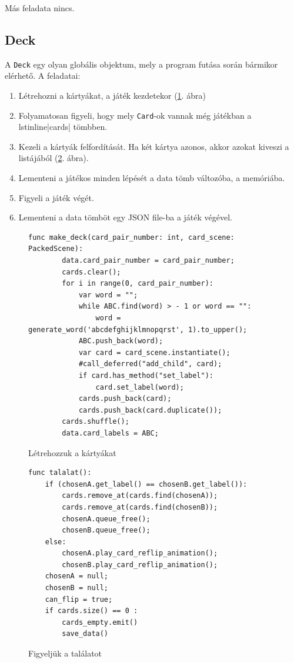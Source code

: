 Más feladata nincs. 


\subsection{Deck}
A \lstinline|Deck| egy olyan globális objektum, mely a program futása során bármikor elérhető. A feladatai: 
\begin{enumerate}
\item Létrehozni a kártyákat, a játék kezdetekor (\ref{code:make_deck}. ábra)
\item Folyamatosan figyeli, hogy mely \lstinline|Card|-ok vannak még játékban a lstinline|cards| tömbben.
\item Kezeli a kártyák felfordítását. Ha két kártya azonos, akkor azokat kiveszi a listájából (\ref{code:talalat}. ábra).
\item Lementeni a játékos minden lépését a data tömb változóba, a memóriába. 
\item Figyeli a játék végét.
\item Lementeni a data tömböt egy JSON file-ba a játék végével.
\end{enumerate}

\begin{figure}[h]
    \centering
    \begin{lstlisting}[language=GDScript]
    func make_deck(card_pair_number: int, card_scene: PackedScene):
        data.card_pair_number = card_pair_number;
        cards.clear();
        for i in range(0, card_pair_number):
            var word = "";
            while ABC.find(word) > - 1 or word == "":
                word = generate_word('abcdefghijklmnopqrst', 1).to_upper();
            ABC.push_back(word);
            var card = card_scene.instantiate();
            #call_deferred("add_child", card);
            if card.has_method("set_label"):
                card.set_label(word);
            cards.push_back(card);
            cards.push_back(card.duplicate());
        cards.shuffle();
        data.card_labels = ABC;
    \end{lstlisting}
    \caption{Létrehozzuk a kártyákat}
    \label{code:make_deck}
\end{figure}
\begin{figure}[h]
    \centering
    \begin{lstlisting}[language=GDScript]
func talalat():
	if (chosenA.get_label() == chosenB.get_label()):
		cards.remove_at(cards.find(chosenA));
		cards.remove_at(cards.find(chosenB));
		chosenA.queue_free();
		chosenB.queue_free();
	else:
		chosenA.play_card_reflip_animation();
		chosenB.play_card_reflip_animation();
	chosenA = null;
	chosenB = null;
	can_flip = true;
	if cards.size() == 0 :
		cards_empty.emit()
		save_data()
    \end{lstlisting}
    \caption{Figyeljük a találatot}
    \label{code:talalat}
\end{figure}


